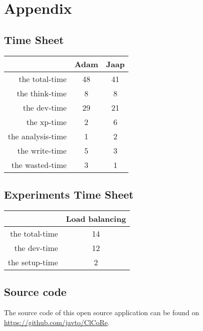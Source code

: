 \section{Appendix}

\subsection{Time Sheet}

\label{timesheet}

\begin{tabular}{| r | c | c |}
	\hline
 					& Adam 	& Jaap \\ \hline
  	the total-time 	& 48 	& 41	\\ \hline
	the think-time 	& 8 		& 8 	\\ \hline
 	the dev-time		& 29		& 21	\\ \hline
	the xp-time		& 2		& 6 	\\ \hline
	the analysis-time 	& 1		& 2	\\ \hline
	the write-time 	& 5		& 3	\\ \hline
	the wasted-time 	& 3		& 1	\\ \hline
\end{tabular}

\subsection{Experiments Time Sheet}
\begin{tabular}{| r | c |}
	\hline
 					& Load balancing \\ \hline
  	the total-time 	& 14		\\ \hline
	the dev-time 		& 12 	\\ \hline
 	the setup-time	& 2		\\ \hline
\end{tabular}

\subsection{Source code}
The source code of this open source application can be found on \url{https://github.com/javto/ClCoRe}.